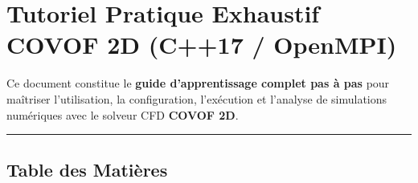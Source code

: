 \documentclass[
  french,
]{article}
\author{}
\date{}
\begin{document}
\section{Tutoriel Pratique Exhaustif COVOF 2D (C++17 /
OpenMPI)}\label{tutoriel-pratique-exhaustif-covof-2d-c17-openmpi}

Ce document constitue le \textbf{guide d'apprentissage complet pas à
pas} pour maîtriser l'utilisation, la configuration, l'exécution et
l'analyse de simulations numériques avec le solveur CFD \textbf{COVOF
2D}.

\begin{center}\rule{0.5\linewidth}{0.5pt}\end{center}

\subsection{Table des Matières}\label{table-des-matiuxe8res}
\end{document}
